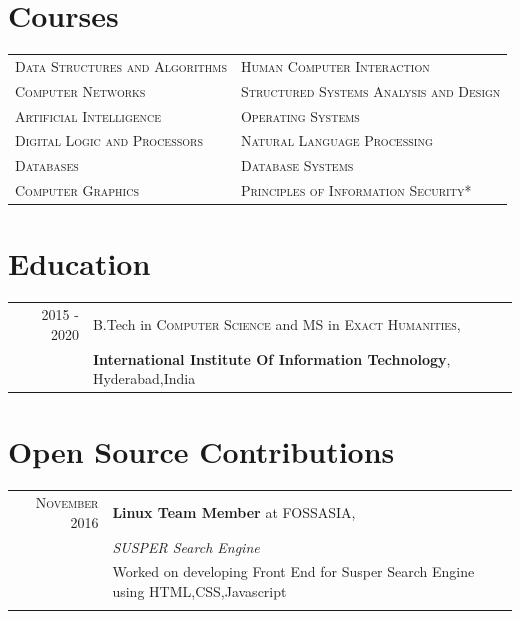 \documentclass[a4paper,10pt]{article}
\begin{document}
\section{Courses}
\begin{tabular}{ll}	
\textsc{Data Structures and Algorithms} &\textsc{Human Computer Interaction} \\
\textsc{Computer Networks}  &\textsc{Structured Systems Analysis and Design}\\
\textsc{Artificial Intelligence} &\textsc{Operating Systems}\\
\textsc{Digital Logic and Processors} &\textsc{Natural Language Processing}\\
\textsc{Databases} &\textsc{Database Systems}\\
\textsc{Computer Graphics} &\textsc{Principles of Information Security*} \\


\end{tabular}

\section{Education}
\begin{tabular}{rl}	
 \textsc{2015 - 2020} & B.Tech in  \textsc{Computer Science} and MS in \textsc{Exact Humanities},\\ 
 & \textbf{International Institute Of Information Technology}, Hyderabad,India\\
\end{tabular}


\section{Open Source Contributions}
\begin{tabular}{rl}	
 \textsc{November} 2016 & \textbf{Linux Team Member} at \textsc{FOSSASIA}, \\
&  \small\emph{SUSPER Search Engine}\\
&  \footnotesize{Worked on developing Front End for Susper Search Engine using HTML,CSS,Javascript}\\\\


\end{tabular}


\end{document}
